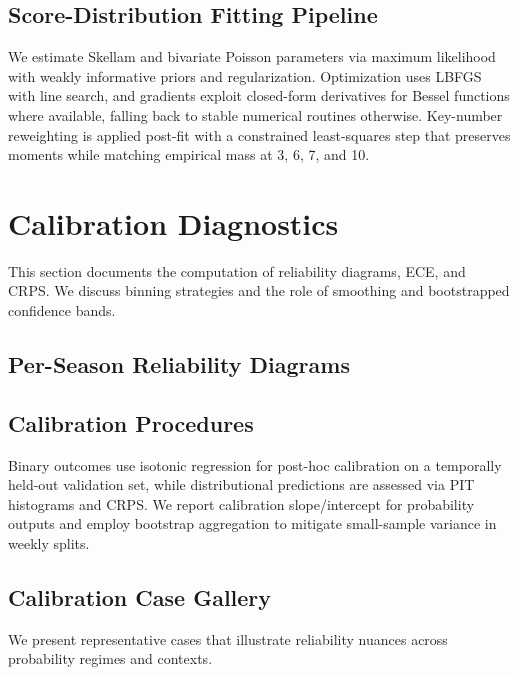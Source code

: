\subsection{Score-Distribution Fitting Pipeline}
We estimate Skellam and bivariate Poisson parameters via maximum likelihood with weakly informative priors and regularization. Optimization uses LBFGS with line search, and gradients exploit closed-form derivatives for Bessel functions where available, falling back to stable numerical routines otherwise. Key-number reweighting is applied post-fit with a constrained least-squares step that preserves moments while matching empirical mass at 3, 6, 7, and 10.

\section{Calibration Diagnostics}\label{app:calibration}
This section documents the computation of reliability diagrams, ECE, and CRPS. We discuss binning strategies and the role of smoothing and bootstrapped confidence bands.

\subsection{Per-Season Reliability Diagrams}

\subsection{Calibration Procedures}
Binary outcomes use isotonic regression for post-hoc calibration on a temporally held-out validation set, while distributional predictions are assessed via PIT histograms and CRPS. We report calibration slope/intercept for probability outputs and employ bootstrap aggregation to mitigate small-sample variance in weekly splits.

\subsection{Calibration Case Gallery}
We present representative cases that illustrate reliability nuances across probability regimes and contexts.

